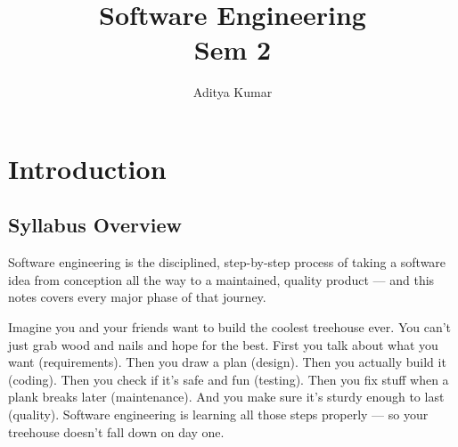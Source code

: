 \documentclass{report}
\title{\Huge{Software Engineering}\\Sem 2}
\author{\huge{Aditya Kumar}}
\date{}
\begin{document}
\maketitle
\newpage%
\tableofcontents
\pagebreak

\chapter{Introduction}
\section{Syllabus Overview}
Software engineering is the disciplined, step-by-step process of taking a software idea from conception all the way to a maintained, quality product — and this notes covers every major phase of that journey.

\begin{eli5}
	Imagine you and your friends want to build the coolest treehouse ever. You can't just grab wood and nails and hope for the best. First you talk about what you want (requirements). Then you draw a plan (design). Then you actually build it (coding). Then you check if it's safe and fun (testing). Then you fix stuff when a plank breaks later (maintenance). And you make sure it's sturdy enough to last (quality). Software engineering is learning all those steps properly — so your treehouse doesn't fall down on day one.
\end{eli5}

\end{document}
